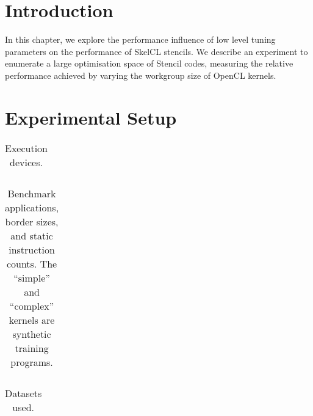 \section{Introduction}

In this chapter, we explore the performance influence of low level
tuning parameters on the performance of SkelCL stencils. We describe
an experiment to enumerate a large optimisation space of Stencil
codes, measuring the relative performance achieved by varying the
workgroup size of OpenCL kernels.


\section{Experimental Setup}


\begin{table}
\footnotesize
\centering
\begin{tabular}{| L{5.5cm} | L{1.5cm} | L{1.5cm} | L{1.5cm} | L{1.5cm} | L{1.5cm} |}
\hline

\hline
\end{tabular}
\caption{%
  Execution devices. %
}
\label{tab:hw}
\end{table}

\begin{table}
\footnotesize
\centering
\begin{tabular}{| l | l | l | l | l | l |}
\hline

\hline
\end{tabular}
\caption{%
  Benchmark applications, border sizes, and static instruction counts.
  The ``simple'' and ``complex'' kernels are synthetic training
  programs. %
}
\label{tab:kernels}
\end{table}

\begin{table}
\footnotesize
\centering
\begin{tabular}{| l | l | l | l |}
\hline

\hline
\end{tabular}
\caption{%
  Datasets used.%
}
\label{tab:datasets}
\end{table}

